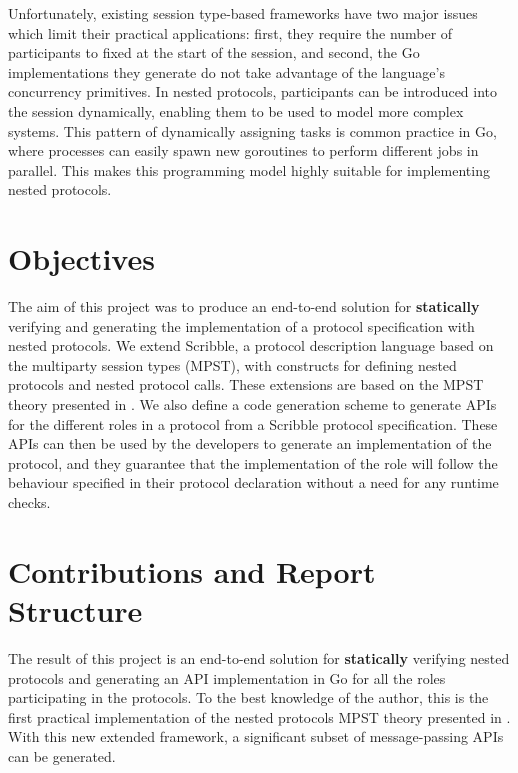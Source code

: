 \documentclass[12pt,twoside]{report}
\begin{document}
Unfortunately, existing session type-based frameworks have two major issues which limit their practical applications: first, they require the number of participants to fixed at the start of the session, and second, the Go implementations they generate do not take advantage of the language's concurrency primitives\cite{parametrictypes}. In nested protocols, participants can be introduced into the session dynamically, enabling them to be used to model more complex systems. This pattern of dynamically assigning tasks is common practice in Go, where processes can easily spawn new goroutines to perform different jobs in parallel. This makes this programming model highly suitable for implementing nested protocols.


\section{Objectives}
The aim of this project was to produce an end-to-end solution for \textbf{statically} verifying and generating the implementation of a protocol specification with nested protocols. We extend Scribble\cite{scribble}, a protocol description language based on the multiparty session types (MPST), with constructs for defining nested protocols and nested protocol calls. These extensions are based on the MPST theory presented in \cite{nestedprotocols}. We also define a code generation scheme to generate APIs for the different roles in a protocol from a Scribble protocol specification. These APIs can then be used by the developers to generate an implementation of the protocol, and they guarantee that the implementation of the role will follow the behaviour specified in their protocol declaration without a need for any runtime checks.

\section{Contributions and Report Structure}
The result of this project is an end-to-end solution for \textbf{statically} verifying nested protocols and generating an API implementation in Go for all the roles participating in the protocols. To the best knowledge of the author, this is the first practical implementation of the nested protocols MPST theory presented in \cite{nestedprotocols}. With this new extended framework, a significant subset of message-passing APIs can be generated.\\
\end{document}
